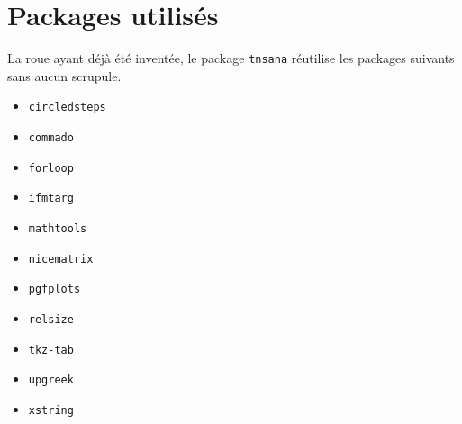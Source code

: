 \documentclass[12pt,a4paper]{article}
\begin{document}
\section{Packages utilisés}

La roue ayant déjà été inventée, le package \verb#tnsana# réutilise les packages suivants sans aucun scrupule.

\begin{multicols}{4}
    \begin{itemize}
        \item \verb#circledsteps#
        \item \verb#commado#
        \item \verb#forloop#
        \item \verb#ifmtarg#
        \item \verb#mathtools#
        \item \verb#nicematrix#
        \item \verb#pgfplots#
        \item \verb#relsize#
        \item \verb#tkz-tab#
        \item \verb#upgreek#
        \item \verb#xstring#
    \end{itemize}
\end{multicols}
\end{document}
